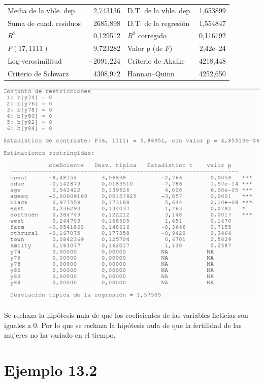 \begin{center}
\vspace{1ex}
\begin{tabular}{lrlr}
Media de la vble. dep. &  2,743136 & D.T. de la vble. dep. &  1,653899 \\
Suma de cuad. residuos &  2685,898 & D.T. de la regresión &  1,554847 \\
$R^2$ &  0,129512 & $R^2$ corregido &  0,116192 \\
$F(17, 1111)$ &  9,723282 & Valor p (de $F$) &  2,42\textrm{e--24} \\
Log-verosimilitud & $-$2091,224 & Criterio de Akaike &  4218,448 \\
Criterio de Schwarz &  4308,972 & Hannan--Quinn &  4252,650 \\
\end{tabular}
\end{center}

\begin{center}
    \includegraphics[scale = .5]{./image/kids_contraste_gretl.png}
\end{center}

Se rechaza la hipótesis nula de que los coeficientes de las variables ficticias son iguales a 0. Por lo que se rechaza la hipótesis nula de que la fertilidad de las mujeres no ha variado en el tiempo.


\section{Ejemplo 13.2}

